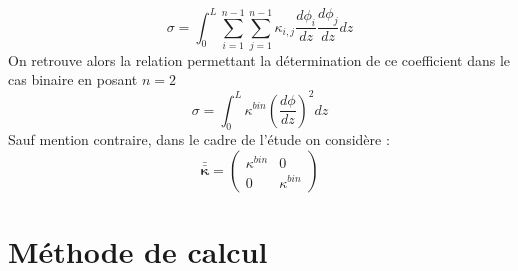 \begin{appendix}
\begin{equation}
\sigma = \int_0^L \sum_{i=1}^{n-1}\sum_{j=1}^{n-1} \kappa_{i,j}\frac{d\phi_i}{dz}\frac{d\phi_j}{dz}dz
\end{equation}
On retrouve alors la relation permettant la détermination de ce coefficient dans le cas binaire en posant $n=2$
\begin{equation}
\sigma = \int_0^L\kappa^{bin}\left(\frac{d\phi}{dz}\right)^2dz
\end{equation}
Sauf mention contraire, dans le cadre de l'étude on considère :
\begin{equation}
\bm{\bar{\bar{\kappa}}} =    \begin{pmatrix} 
\kappa^{bin}& 0 \\ 
0				& \kappa^{bin} 
\end{pmatrix} 
\end{equation}
\section{Méthode de calcul}



\end{appendix}
